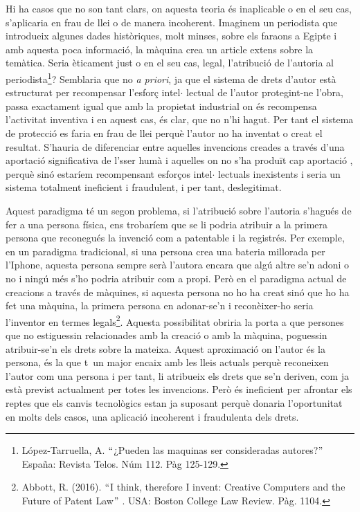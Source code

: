 \documentclass[12pt]{article}
\renewcommand{\_}{\kern-1.5pt\textunderscore\kern-1.5pt}
\begin{document}
\begin{itemize}
\vspace{\baselineskip}
\begin{justify}
Hi ha casos que no son tant clars, on aquesta teoria és inaplicable o en el seu cas, s’aplicaria en frau de llei o de manera incoherent. Imaginem un periodista que introdueix algunes dades històriques, molt minses, sobre els faraons a Egipte i amb aquesta poca informació, la màquina crea un article extens sobre la temàtica. Seria èticament just o en el seu cas, legal, l’atribució de l’autoria al periodista\footnote{ López-Tarruella, A. $``$¿Pueden las maquinas ser consideradas autores?$"$  España: Revista Telos. Núm 112. Pàg 125-129.  }? Semblaria que no \textit{a priori}, ja que el sistema de drets d’autor està estructurat per recompensar l’esforç intel$ \cdot $ lectual de l’autor protegint-ne l’obra, passa exactament igual que amb la propietat industrial on és recompensa l’activitat inventiva i en aquest cas, és clar, que no n’hi hagut. Per tant el sistema de protecció es faria en frau de llei perquè l’autor no ha inventat o creat el resultat. S’hauria de diferenciar entre aquelles invencions creades a través d’una aportació significativa de l’sser humà i aquelles on no s’ha produït cap aportació , perquè sinó estaríem recompensant esforços intel$ \cdot $ lectuals inexistents i seria un sistema totalment ineficient i fraudulent, i per tant, deslegitimat. 
\end{justify}\par


\vspace{\baselineskip}
\begin{justify}
Aquest paradigma té un segon problema, si l’atribució sobre l’autoria s’hagués de fer a una persona física, ens trobaríem que se li podria atribuir a la primera persona que reconegués la invenció com a patentable i la registrés. Per exemple, en un paradigma tradicional, si una persona crea una bateria millorada per l’Iphone, aquesta persona sempre serà l’autora encara que algú altre se’n adoni o no i ningú més s’ho podria atribuir com a propi. Però en el paradigma actual de creacions a través de màquines, si aquesta persona no ho ha creat sinó que ho ha fet una màquina, la primera persona en adonar-se’n i reconèixer-ho seria l’inventor en termes legals\footnote{ Abbott, R. (2016). $``$I think, therefore I invent: Creative Computers and the Future of Patent Law$"$ . USA: Boston College Law Review. Pàg. 1104. }.  Aquesta possibilitat obriria la porta a que persones que no estiguessin relacionades amb la creació o amb la màquina, poguessin atribuir-se’n els drets sobre la mateixa. Aquest aproximació on l’autor és la persona, és la que t\ un major encaix amb les lleis actuals perquè reconeixen l’autor com una persona  i per tant, li atribueix els drets que se’n deriven, com ja està previst actualment per totes les invencions. Però és ineficient per afrontar els reptes que els canvis tecnològics estan ja suposant perquè donaria l’oportunitat en molts dels casos, una aplicació incoherent i fraudulenta dels drets.
\end{justify}\par



\end{itemize}
\end{document}
